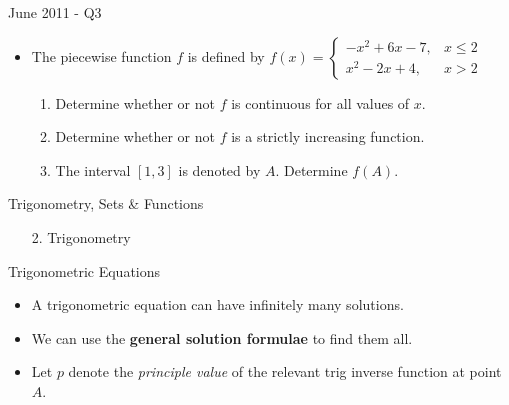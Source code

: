 \documentclass[10pt]{beamer}
\begin{document}
\begin{frame}{June 2011 - Q3}
	\begin{itemize}
		\item The piecewise function $f$ is defined by 
		$f(x) = \begin{cases} -x^2 + 6x - 7, & x \leq 2 \\ x^2 - 2x + 4, &  x > 2 \end{cases}$ 
		\begin{enumerate}
			\item Determine whether or not $f$ is continuous for all values of $x$.
			\item Determine whether or not $f$ is a strictly increasing function.
			\item The interval $[1,3]$ is denoted by $A$. Determine $f(A)$.
		\end{enumerate}
	\end{itemize}
\end{frame}

\begin{frame}{Trigonometry, Sets \& Functions}
	\begin{enumerate}
		\item [2.] Trigonometry
	\end{enumerate}
\end{frame}

\begin{frame}{Trigonometric Equations}
	\begin{itemize}[<+->]
		\item A trigonometric equation can have infinitely many solutions. 
		\item We can use the \textbf{general solution formulae} to find them all.
		\item Let $p$ denote the \textit{principle value} of the relevant trig inverse function at point $A$.
	\end{itemize}



\end{frame}
\end{document}
